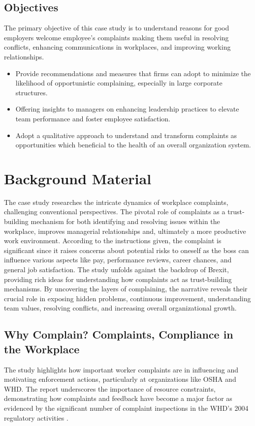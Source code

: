 \documentclass[a4paper,12pt]{article}
\begin{document}
\subsection{Objectives}
The primary objective of this case study is to understand reasons for good employers welcome employee’s complaints making them useful in resolving conflicts, enhancing communications in workplaces, and improving working relationships.
\begin{itemize}
    \item Provide recommendations and measures that firms can adopt to minimize the likelihood of opportunistic complaining, especially in large corporate structures.
    \item Offering insights to managers on enhancing leadership practices to elevate team performance and foster employee satisfaction.
    \item Adopt a qualitative approach to understand and transform complaints as opportunities which beneficial to the health of an overall organization system.
\end{itemize}


\newpage
\section{Background Material}
The case study researches the intricate dynamics of workplace complaints, challenging conventional perspectives. The pivotal role of complaints as a trust-building mechanism for both identifying and resolving issues within the workplace, improves managerial relationships and, ultimately a more productive work environment\cite{employee_manager}. According to the instructions given, the complaint is significant since it raises concerns about potential risks to oneself as the boss can influence various aspects like pay, performance reviews, career chances, and general job satisfaction\cite{complain_boss}. The study unfolds against the backdrop of Brexit, providing rich ideas for understanding how complaints act as trust-building mechanisms. By uncovering the layers of complaining,  the narrative reveals their crucial role in exposing hidden problems, continuous improvement, understanding team values, resolving conflicts, and increasing overall organizational growth\cite{opportunistic_complain}.

\subsection{Why Complain? Complaints, Compliance in the Workplace}
The study highlights how important worker complaints are in influencing and motivating enforcement actions, particularly at organizations like OSHA and WHD. The report underscores the importance of resource constraints, demonstrating how complaints and feedback have become a major factor as evidenced by the significant number of complaint inspections in the WHD's 2004 regulatory activities \cite{why_complaints}. 
\end{document}
